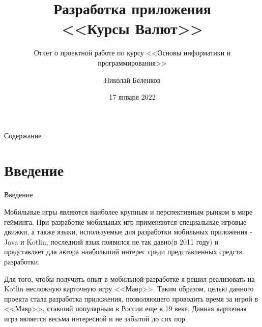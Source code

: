 \documentclass[aspectratio=169,xcolor=dvipsnames]{beamer}
\title[short title]{Разработка приложения \\ <<Курсы Валют>> }
\subtitle{Отчет о проектной работе по курсу <<Основы информатики и программирования>>}
\author[belenkov] {Николай Беленков}
\institute[NTU] %
{
    Институт Математики и Информационных Технологий \\
    Петрозаводский Государственный Университет
    \vskip 3pt
}
\date{17 января 2022} %
\begin{document}

\lstset{escapechar=@,style=customc}

\begin{frame}
    \titlepage
    \end{frame}

\begin{frame}{Содержание}
    \tableofcontents
\end{frame}

\section{Введение}

\begin{frame}[fragile]{Введение}
\begin{justifying}
Мобильные игры являются наиболее крупным и перспективным рынком в мире гейминга. При разработке мобильных игр применяются специальные игровые движки, а также языки, используемые для разработки мобильных приложения - Java и Kotlin, последний язык появился не так давно(в 2011 году) и представляет для автора наибольший интерес среди представленных средств разработки.

Для того, чтобы получить опыт в мобильной разработке я решил реализовать на Kotlin несложную карточную игру <<Мавр>>. Таким образом, целью данного проекта стала разработка приложения, позволяющего проводить время за игрой в <<Мавр>>, ставший популярным в России еще в 19 веке. Данная карточная игра является весьма интересной и не забытой до сих пор.
\end{justifying}
\end{frame}
\end{document}
